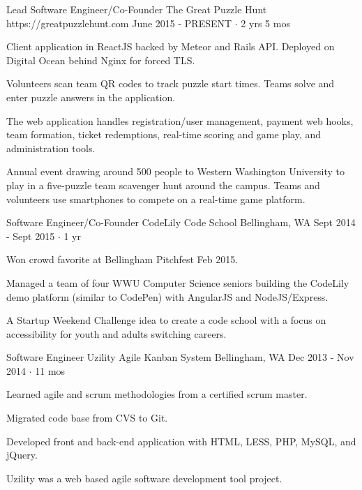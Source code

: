\documentclass[11pt, a4paper]{awesome-cv}
\begin{document}
\newpage
\begin{cventries}

  \cventry
    {Lead Software Engineer/Co-Founder} %
    {The Great Puzzle Hunt} %
    {https://greatpuzzlehunt.com} %
    {June 2015 - PRESENT $\cdot$ 2 yrs 5 mos} %
    {
      \begin{cvitems} %
        \item Client application in ReactJS backed by Meteor and Rails API. Deployed on Digital Ocean behind Nginx for forced TLS.
        \item Volunteers scan team QR codes to track puzzle start times. Teams solve and enter puzzle answers in the application.
        \item The web application handles registration/user management, payment web hooks, team formation, ticket redemptions, real-time scoring and game play, and administration tools.
      \end{cvitems}
    }
    {
      Annual event drawing around 500 people to Western Washington University to play in a five-puzzle team scavenger hunt around the campus.
      Teams and volunteers use smartphones to compete on a real-time game platform.
    }

  \cventry
    {Software Engineer/Co-Founder} %
    {CodeLily Code School} %
    {Bellingham, WA} %
    {Sept 2014 - Sept 2015 $\cdot$ 1 yr} %
    {
      \begin{cvitems} %
        \item Won crowd favorite at Bellingham Pitchfest Feb 2015.
        \item Managed a team of four WWU Computer Science seniors building the CodeLily demo platform (similar to CodePen) with AngularJS and NodeJS/Express.
      \end{cvitems}
    }
    {A Startup Weekend Challenge idea to create a code school with a focus on accessibility for youth and adults switching careers.}

  \cventry
    {Software Engineer} %
    {Uzility Agile Kanban System} %
    {Bellingham, WA} %
    {Dec 2013 - Nov 2014 $\cdot$ 11 mos} %
    {
      \begin{cvitems} %
        \item Learned agile and scrum methodologies from a certified scrum master.
        \item Migrated code base from CVS to Git.
        \item Developed front and back-end application with HTML, LESS, PHP, MySQL, and jQuery.
      \end{cvitems}
    }
    {Uzility was a web based agile software development tool project.}
\end{cventries}
\end{document}
